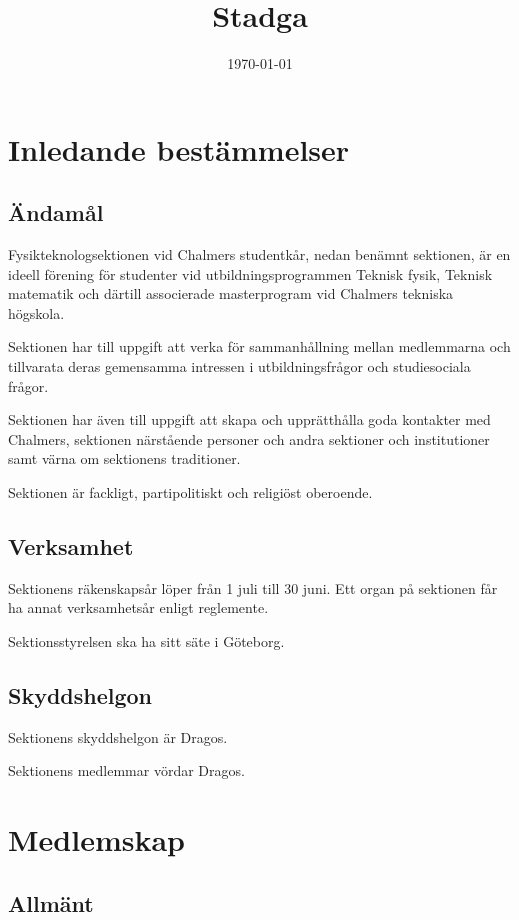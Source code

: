 \documentclass{styrdokument}
\title{Stadga}
\date{\today}
\begin{document}
\section{Inledande bestämmelser}

\subsection{Ändamål}

\? Fysikteknologsektionen vid Chalmers studentkår, nedan benämnt sektionen, är en ideell förening för studenter vid utbildningsprogrammen Teknisk fysik, Teknisk matematik och därtill associerade masterprogram vid Chalmers tekniska högskola.

\? Sektionen har till uppgift att verka för sammanhållning mellan medlemmarna och tillvarata deras gemensamma intressen i utbildningsfrågor och studiesociala frågor.

\? Sektionen har även till uppgift att skapa och upprätthålla goda kontakter med Chalmers, sektionen närstående personer och andra sektioner och institutioner samt värna om sektionens traditioner.

\? Sektionen är fackligt, partipolitiskt och religiöst oberoende.

\subsection{Verksamhet}

\? Sektionens räkenskapsår löper från 1 juli till 30 juni.
Ett organ på sektionen får ha annat verksamhetsår enligt reglemente.

\? Sektionsstyrelsen ska ha sitt säte i Göteborg.

\subsection{Skyddshelgon}

\? Sektionens skyddshelgon är Dragos.

\? Sektionens medlemmar vördar Dragos.

\section{Medlemskap}

\subsection{Allmänt}
\end{document}
